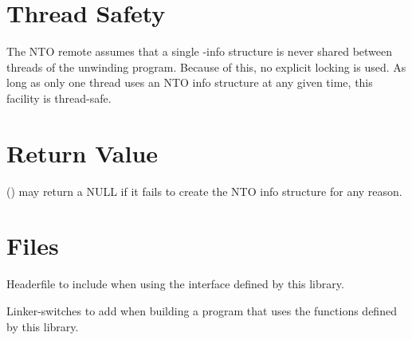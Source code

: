\documentclass{article}
\begin{document}
\section{Thread Safety}

The  NTO remote assumes that a single -info
structure is never shared between threads of the unwinding program.
Because of this,
no explicit locking is used.
As long as only one thread uses an NTO info structure at any given time,
this facility is thread-safe.

\section{Return Value}

() may return a NULL if it fails
to create the NTO info structure for any reason.

\section{Files}

\begin{Description}
\item[\File{libunwind-nto.h}] Headerfile to include when using the
  interface defined by this library.
\item[\Opt{-l}\File{unwind-nto} \Opt{-l}\File{unwind-generic}]
    Linker-switches to add when building a program that uses the
    functions defined by this library.
\end{Description}
\end{document}
